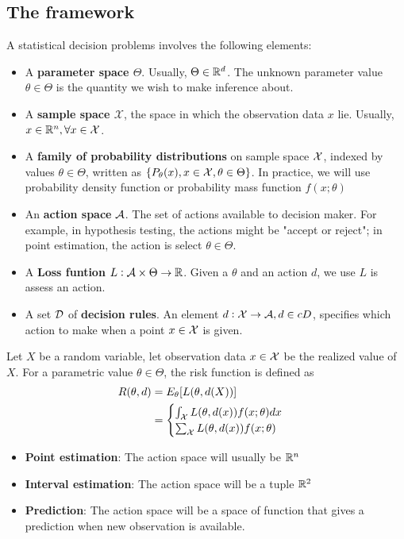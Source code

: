\begin{refsection}
\subsection{The framework}
\cite[4]{young2005essentials} A statistical decision problems involves the following elements:
\begin{itemize}
    \item A \textbf{parameter space $\Theta$}. Usually, $\Theta \in \mathbb{R}^d$. The unknown parameter value $\theta \in \Theta$ is the quantity we wish to make inference about.
    \item A \textbf{sample space $\mathcal{X}$}, the space in which the observation data $x$ lie. Usually, $x\in \mathbb{R}^n, \forall x \in \mathcal{X}$.
    \item A \textbf{family of probability distributions} on sample space $\mathcal{X}$, indexed by values $\theta \in \Theta$, written as $\{P_{\theta}(x),x\in \mathcal{X}, \theta \in \Theta\}$. In practice, we will use probability density function or probability mass function $f(x;\theta)$
    \item An \textbf{action space }$\mathcal{A}$. The set of actions available to decision maker. For example, in hypothesis testing, the actions might be "accept or reject"; in point estimation, the action is select $\theta \in \Theta$.
    \item A \textbf{Loss funtion} $L:\mathcal{A}\times \Theta \to \mathbb{R}$. Given a $\theta$ and an action $d$, we use $L$ is assess an action.
    \item A set $\mathcal{D}$ of \textbf{decision rules}. An element $d:\mathcal{X}\to \mathcal{A}, d\in cD$, specifies which action to make when a point $x\in \mathcal{X}$ is given. 
\end{itemize}

\begin{definition}
Let $X$ be a random variable, let observation data $x\in \mathcal{X}$ be the realized value of $X$. For a parametric value $\theta \in \Theta$, the risk function is defined as
\begin{align}
    R(\theta,d) &= E_{\theta}[L(\theta,d(X))]\\
    &= \begin{cases}
        \int_{\mathcal{X}} L(\theta,d(x))f(x;\theta)dx\\
        \sum_{\mathcal{X}} L(\theta,d(x))f(x;\theta)
        \end{cases}
\end{align}
\end{definition}


\begin{example}\cite[17]{bickel2015mathematical} \hfill
\begin{itemize}
    \item \textbf{Point estimation}: The action space will usually be $\mathbb{R}^n$
    \item \textbf{Interval estimation}: The action space will be a tuple $\mathbb{R}^2$
    \item \textbf{Prediction}: The action space will be a space of function that gives a prediction when new observation is available. 
\end{itemize}
\end{example}



\end{refsection}
